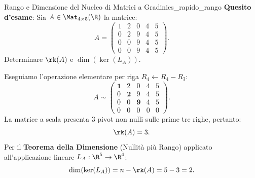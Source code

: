 \begin{esempio}{Rango e Dimensione del Nucleo di Matrici a Gradini}{es_rapido_rango}
\textbf{Quesito d'esame}: Sia $A \in \Mat_{4 \times 5}(\R)$ la matrice:
\begin{equation}
    A = \begin{pmatrix}
        1 & 2 & 0 & 4 & 5 \\
        0 & 2 & 9 & 4 & 5 \\
        0 & 0 & 9 & 4 & 5 \\
        0 & 0 & 9 & 4 & 5
    \end{pmatrix}.
\end{equation}
Determinare $\rk(A)$ e $\dim(\ker(L_A))$.

\begin{dimostrazione}[Risoluzione]
Eseguiamo l'operazione elementare per riga $R_4 \leftarrow R_4 - R_3$:
\begin{equation}
    A \sim \begin{pmatrix}
        \mathbf{1} & 2 & 0 & 4 & 5 \\
        0 & \mathbf{2} & 9 & 4 & 5 \\
        0 & 0 & \mathbf{9} & 4 & 5 \\
        0 & 0 & 0 & 0 & 0
    \end{pmatrix}.
\end{equation}
La matrice a scala presenta $3$ pivot non nulli sulle prime tre righe, pertanto:
\begin{equation}
    \rk(A) = 3.
\end{equation}
Per il \textbf{Teorema della Dimensione} (Nullità più Rango) applicato all'applicazione lineare $L_A: \R^5 \to \R^4$:
\begin{equation}
    \dim(\ker(L_A)) = n - \rk(A) = 5 - 3 = 2.
\end{equation}
\end{dimostrazione}
\end{esempio}

